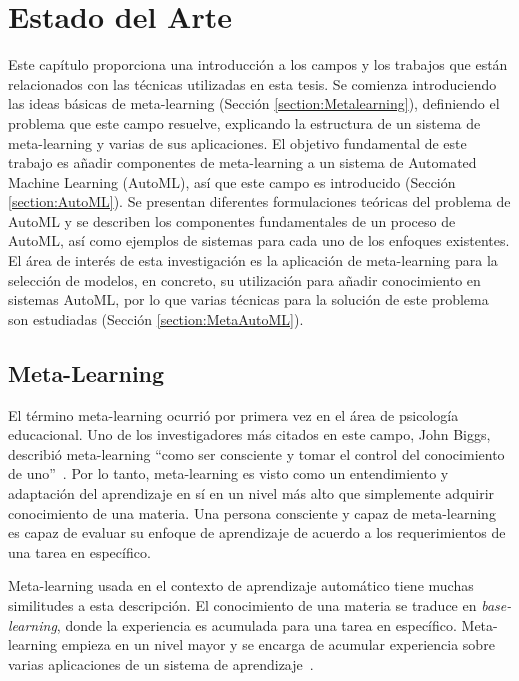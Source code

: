 \chapter{Estado del Arte}\label{chapter:state-of-the-art}

Este capítulo proporciona una introducción a los campos y los trabajos que
están relacionados con las técnicas utilizadas en esta tesis. Se comienza
introduciendo las ideas básicas de meta-learning
(Sección \ref{section:Metalearning}), definiendo el problema que este campo
resuelve, explicando la estructura de un sistema de meta-learning y varias de
sus aplicaciones. El objetivo fundamental de este trabajo es añadir componentes
de meta-learning a un sistema de Automated Machine Learning (AutoML), así que
este campo es introducido (Sección \ref{section:AutoML}). Se presentan
diferentes formulaciones teóricas del problema de AutoML y se describen los
componentes fundamentales de un proceso de AutoML, así como ejemplos de
sistemas para cada uno de los enfoques existentes. El área de interés de esta
investigación es la aplicación de meta-learning para la selección de modelos,
en concreto, su utilización para añadir conocimiento en sistemas AutoML, por
lo que varias técnicas para la solución de este problema son estudiadas
(Sección \ref{section:MetaAutoML}).

\section{Meta-Learning}\label{section:metalearning}

El término meta-learning ocurrió por primera vez en el área de psicología
educacional. Uno de los investigadores más citados en este campo, John Biggs,
describió meta-learning ``como ser consciente y tomar el control del
conocimiento de uno''~. Por lo tanto, meta-learning
es visto como un entendimiento y adaptación del aprendizaje en sí en un nivel
más alto que simplemente adquirir conocimiento de una materia. Una persona
consciente y capaz de meta-learning es capaz de evaluar su enfoque de
aprendizaje de acuerdo a los requerimientos de una tarea en específico.

Meta-learning usada en el contexto de aprendizaje automático tiene muchas
similitudes a esta descripción. El conocimiento de una materia se traduce en
\textit{base-learning}, donde la experiencia es acumulada para una tarea en
específico. Meta-learning empieza en un nivel mayor y se encarga de acumular
experiencia sobre varias aplicaciones de un sistema de
aprendizaje~.

